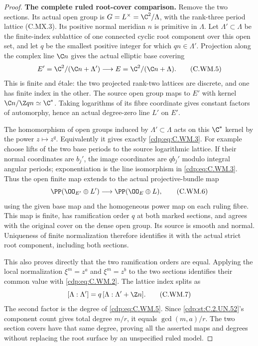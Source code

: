 \begin{proof}
\par\medskip\noindent\textbf{The complete ruled root-cover comparison.}
Remove the two sections. Its actual open group is
$G=L^\times=\C^2/\Lambda$, with the rank-three
period lattice (C.MX.3). Its positive normal
meridian $n$ is primitive in $\Lambda$.
Let $\Lambda'\subset\Lambda$ be the finite-index
sublattice of one connected cyclic root component
over this open set, and let $q$ be the smallest
positive integer for which $qn\in\Lambda'$.
Projection along the complex line $\C n$
gives the actual elliptic base covering
\[
 E'=\C^2/(\C n+\Lambda')
      \longrightarrow
 E=\C^2/(\C n+\Lambda).
\tag{C.WM.5}\label{cdp:eq:C.WM.5}
\]
This is finite and \'{e}tale: the two projected
rank-two lattices are discrete, and one has
finite index in the other. The source open
group maps to $E'$ with kernel
$\C n/\Z qn\simeq\C^*$.
Taking logarithms of its fibre coordinate
gives constant factors of automorphy, hence
an actual degree-zero line $L'$ on $E'$.

The homomorphism of open groups induced by
$\Lambda'\subset\Lambda$ acts on this
$\C^*$ kernel by the power $z\mapsto z^q$.
Equivalently it gives exactly \eqref{cdp:eq:C.WM.3}.
For example choose lifts of the two base
periods to the source logarithmic lattice.
If their normal coordinates are $b_j'$,
the image coordinates are $qb_j'$ modulo
integral angular periods; exponentiation
is the line isomorphism in \eqref{cdp:eq:C.WM.3}.
Thus the open finite map extends to the
actual projective-bundle map
\[
 \PP(\OO_{E'}\oplus L')
          \longrightarrow \PP(\OO_E\oplus L),
\tag{C.WM.6}\label{cdp:eq:C.WM.6}
\]
using the given base map and the homogeneous
power map on each ruling fibre.
This map is finite, has ramification order
$q$ at both marked sections, and agrees
with the original cover on the dense open
group. Its source is smooth and normal.
Uniqueness of finite normalization therefore
identifies it with the actual strict root
component, including both sections.

This also proves directly that the two
ramification orders are equal. Applying
the local normalization
$\xi^m=z^a$ and $\xi^m=z^b$ to the two
sections identifies their common value
with \eqref{cdp:eq:C.WM.2}. The lattice index splits as
\[
 [\Lambda:\Lambda']
     =q\,[\Lambda:\Lambda'+\Z n].
\tag{C.WM.7}\label{cdp:eq:C.WM.7}
\]
The second factor is the degree of \eqref{cdp:eq:C.WM.5}.
Since \ref{cdp:st:C.2.UN.52}'s component count gives total
degree $m/r$, it equals $\gcd(m,a)/r$.
The two section covers have that same
degree, proving all the asserted maps
and degrees without replacing the root
surface by an unspecified ruled model.


\end{proof}
